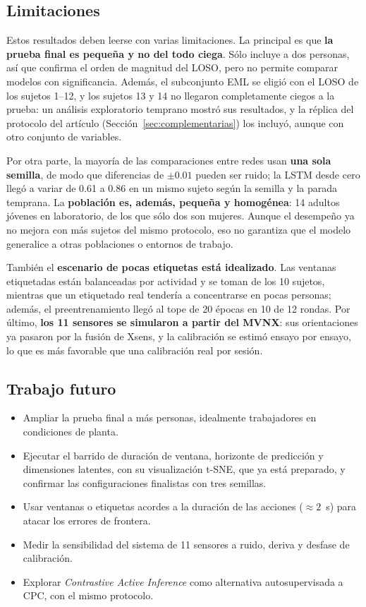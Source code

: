 \documentclass[letterpaper,11pt]{article}
\begin{document}
\subsection{Limitaciones}
Estos resultados deben leerse con varias limitaciones. La principal es que \textbf{la prueba final es pequeña y no del todo ciega}. Sólo incluye a dos personas, así que confirma el orden de magnitud del LOSO, pero no permite comparar modelos con significancia. Además, el subconjunto EML se eligió con el LOSO de los sujetos 1--12, y los sujetos 13 y 14 no llegaron completamente ciegos a la prueba: un análisis exploratorio temprano mostró sus resultados, y la réplica del protocolo del artículo (Sección~\ref{sec:complementarias}) los incluyó, aunque con otro conjunto de variables.

Por otra parte, la mayoría de las comparaciones entre redes usan \textbf{una sola semilla}, de modo que diferencias de $\pm 0.01$ pueden ser ruido; la LSTM desde cero llegó a variar de 0.61 a 0.86 en un mismo sujeto según la semilla y la parada temprana. La \textbf{población es, además, pequeña y homogénea}: 14 adultos jóvenes en laboratorio, de los que sólo dos son mujeres. Aunque el desempeño ya no mejora con más sujetos del mismo protocolo, eso no garantiza que el modelo generalice a otras poblaciones o entornos de trabajo.

También el \textbf{escenario de pocas etiquetas está idealizado}. Las ventanas etiquetadas están balanceadas por actividad y se toman de los 10 sujetos, mientras que un etiquetado real tendería a concentrarse en pocas personas; además, el preentrenamiento llegó al tope de 20 épocas en 10 de 12 rondas. Por último, \textbf{los 11 sensores se simularon a partir del MVNX}: sus orientaciones ya pasaron por la fusión de Xsens, y la calibración se estimó ensayo por ensayo, lo que es más favorable que una calibración real por sesión.

\subsection{Trabajo futuro}
\begin{itemize}
  \item Ampliar la prueba final a más personas, idealmente trabajadores en condiciones de planta.
  \item Ejecutar el barrido de duración de ventana, horizonte de predicción y dimensiones latentes, con su visualización t-SNE, que ya está preparado, y confirmar las configuraciones finalistas con tres semillas.
  \item Usar ventanas o etiquetas acordes a la duración de las acciones ($\approx 2$~s) para atacar los errores de frontera.
  \item Medir la sensibilidad del sistema de 11 sensores a ruido, deriva y desfase de calibración.
  \item Explorar \emph{Contrastive Active Inference} \parencite{mazzaglia2021} como alternativa autosupervisada a CPC, con el mismo protocolo.
\end{itemize}
\end{document}
